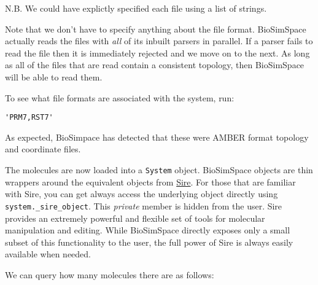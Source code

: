 \begin{Shaded}
\begin{Highlighting}[]
\OperatorTok{=}\NormalTok{)}
\end{Highlighting}
\end{Shaded}

N.B. We could have explictly specified each file using a list of
strings.

Note that we don't have to specify anything about the file format.
BioSimSpace actually reads the files with \emph{all} of its inbuilt
parsers in parallel. If a parser fails to read the file then it is
immediately rejected and we move on to the next. As long as all of the
files that are read contain a consistent topology, then BioSimSpace will
be able to read them.

To see what file formats are associated with the system, run:

\begin{Shaded}
\begin{Highlighting}[]
\end{Highlighting}
\end{Shaded}

\begin{verbatim}
'PRM7,RST7'
\end{verbatim}

As expected, BioSimpace has detected that these were AMBER format
topology and coordinate files.

The molecules are now loaded into a \texttt{System} object. BioSimSpace
objects are thin wrappers around the equivalent objects from
\href{https://github.com/michellab/Sire}{Sire}. For those that are
familiar with Sire, you can get always access the underlying object
directly using \texttt{system.\_sire\_object}. This \emph{private}
member is hidden from the user. Sire provides an extremely powerful and
flexible set of tools for molecular manipulation and editing. While
BioSimSpace directly exposes only a small subset of this functionality
to the user, the full power of Sire is always easily available when
needed.

We can query how many molecules there are as follows:

\begin{Shaded}
\begin{Highlighting}[]
\end{Highlighting}
\end{Shaded}

